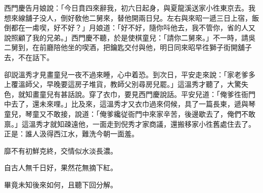 西門慶告月娘說：「今日賁四來辭我，初六日起身，與夏龍溪送家小徃東京去。我想來線舖子没人，倒好敎他二舅來，替他開兩日兒。左右與來昭一遞三日上宿，飯倒都在一䖏喫，好不好？」月娘道：「好不好，隨你呌他去，我不管你，省的人又說照顧了我的兄弟。」西門慶不聽，於是使棋童兒：「請你二舅來。」不一時，請吳二舅到，在前廳陪他坐的喫酒，把鑰匙交付與他，明日同來昭早徃獅子街開舖子去，不在話下。

卻説溫秀才見畫童兒一夜不過來睡，心中着恐。到次日，平安走來說：「家老爹多上覆溫師父，早晚要這房子堆貨，教師父別尋房兒罷。」這溫秀才聽了，大驚失色，就知畫童兒有甚話說。穿了衣巾，要見西門慶說話。平安兒道：「俺爹徃衙門中去了，還未來哩。」比及來，這溫秀才又衣巾過來伺候，具了一篇長柬，遞與琴童兒，琴童又不敢接，說道：「俺爹纔従衙門中來家辛苦，後邊歇去了，俺們不敢禀。」這溫秀才就知疎遠他，一面走到倪秀才家商議，還搬移家小徃舊處住去了。正是：誰人汲得西江水，難洗今朝一面羞。

\begin{myquote}
靡不有初鮮克終，交情似水淡長濃。

自古人無千日好，果然花無摘下紅。
\end{myquote}

畢竟未知後來如何，且聽下回分解。

